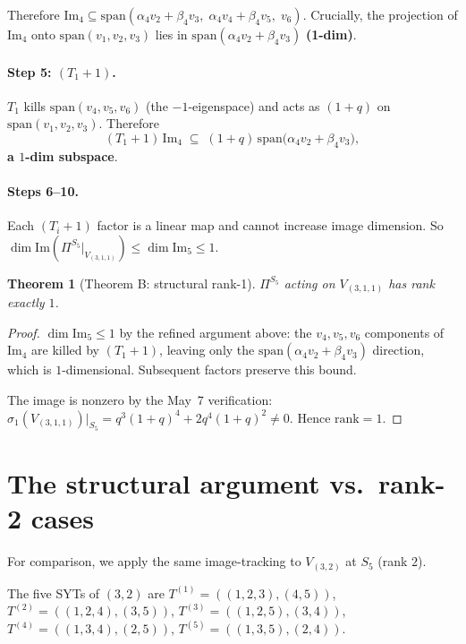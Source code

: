 \documentclass[11pt]{article}
\newtheorem{theorem}{Theorem}
\theoremstyle{definition}
\begin{document}
Therefore $\mathrm{Im}_4 \subseteq \mathrm{span}(\alpha_4 v_2 + \beta_4 v_3,\;
\alpha_4 v_4 + \beta_4 v_5,\;v_6)$.
Crucially, the projection of $\mathrm{Im}_4$ onto
$\mathrm{span}(v_1, v_2, v_3)$ lies in
$\mathrm{span}(\alpha_4 v_2 + \beta_4 v_3)$ \textbf{(1-dim)}.

\paragraph{Step 5: $(T_1{+}1)$.}
$T_1$ kills $\mathrm{span}(v_4, v_5, v_6)$ (the $-1$-eigenspace) and
acts as $(1{+}q)$ on $\mathrm{span}(v_1, v_2, v_3)$. Therefore
\[
(T_1{+}1)\,\mathrm{Im}_4 \;\subseteq\; (1{+}q)\,
\mathrm{span}\bigl(\alpha_4 v_2 + \beta_4 v_3\bigr),
\]
\textbf{a $1$-dim subspace}.

\paragraph{Steps 6--10.} Each $(T_i{+}1)$ factor is a linear map and
cannot increase image dimension. So
$\dim \mathrm{Im}(\Pi^{S_5}|_{V_{(3,1,1)}}) \leq \dim \mathrm{Im}_5 \leq 1$.

\begin{theorem}[Theorem B: structural rank-1]\label{thm:311}
$\Pi^{S_5}$ acting on $V_{(3,1,1)}$ has rank exactly $1$.
\end{theorem}

\begin{proof}
$\dim \mathrm{Im}_5 \leq 1$ by the refined argument above:
the $v_4, v_5, v_6$ components of $\mathrm{Im}_4$ are killed by
$(T_1{+}1)$, leaving only the $\mathrm{span}(\alpha_4 v_2 + \beta_4 v_3)$
direction, which is $1$-dimensional. Subsequent factors preserve
this bound.

The image is nonzero by the May~7 verification:
$\sigma_1(V_{(3,1,1)})|_{S_5} = q^3(1{+}q)^4 + 2q^4(1{+}q)^2 \neq 0$.
Hence $\mathrm{rank} = 1$.
\end{proof}

\section{The structural argument vs.\ rank-2 cases}\label{sec:rank2}

For comparison, we apply the same image-tracking to
$V_{(3,2)}$ at $S_5$ (rank $2$).

The five SYTs of $(3,2)$ are
$T^{(1)} = ((1,2,3),(4,5))$,
$T^{(2)} = ((1,2,4),(3,5))$,
$T^{(3)} = ((1,2,5),(3,4))$,
$T^{(4)} = ((1,3,4),(2,5))$,
$T^{(5)} = ((1,3,5),(2,4))$.
\end{document}
